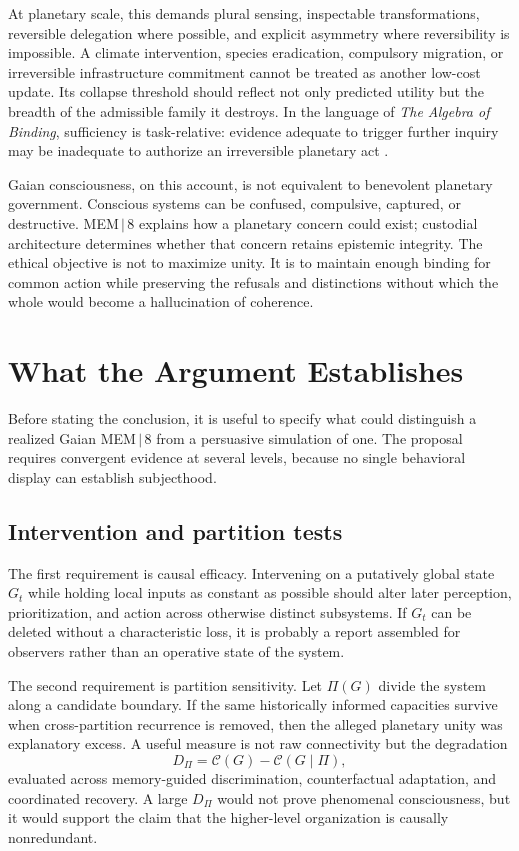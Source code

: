 \documentclass[11pt]{article}
\begin{document}
At planetary scale, this demands plural sensing, inspectable transformations, reversible delegation where possible, and explicit asymmetry where reversibility is impossible. A climate intervention, species eradication, compulsory migration, or irreversible infrastructure commitment cannot be treated as another low-cost update. Its collapse threshold should reflect not only predicted utility but the breadth of the admissible family it destroys. In the language of \emph{The Algebra of Binding}, sufficiency is task-relative: evidence adequate to trigger further inquiry may be inadequate to authorize an irreversible planetary act \cite{flyxionBinding}.

Gaian consciousness, on this account, is not equivalent to benevolent planetary government. Conscious systems can be confused, compulsive, captured, or destructive. MEM\,$|$\,8 explains how a planetary concern could exist; custodial architecture determines whether that concern retains epistemic integrity. The ethical objective is not to maximize unity. It is to maintain enough binding for common action while preserving the refusals and distinctions without which the whole would become a hallucination of coherence.

\section{What the Argument Establishes}

Before stating the conclusion, it is useful to specify what could distinguish a realized Gaian MEM\,$|$\,8 from a persuasive simulation of one. The proposal requires convergent evidence at several levels, because no single behavioral display can establish subjecthood.

\subsection{Intervention and partition tests}

The first requirement is causal efficacy. Intervening on a putatively global state $G_t$ while holding local inputs as constant as possible should alter later perception, prioritization, and action across otherwise distinct subsystems. If $G_t$ can be deleted without a characteristic loss, it is probably a report assembled for observers rather than an operative state of the system.

The second requirement is partition sensitivity. Let $\Pi(G)$ divide the system along a candidate boundary. If the same historically informed capacities survive when cross-partition recurrence is removed, then the alleged planetary unity was explanatory excess. A useful measure is not raw connectivity but the degradation
\[
D_{\Pi}=\mathcal{C}(G)-\mathcal{C}(G\mid \Pi),
\]
evaluated across memory-guided discrimination, counterfactual adaptation, and coordinated recovery. A large $D_{\Pi}$ would not prove phenomenal consciousness, but it would support the claim that the higher-level organization is causally nonredundant.
\end{document}

